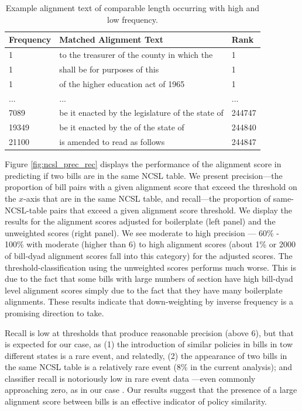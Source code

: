 \documentclass[12pt]{article} %
\begin{document}
\begin{table}[]
\centering
\caption{Example alignment text of comparable length occurring with high and low frequency.}
\label{tab:expl_align_freq}
\begin{tabular}{lll}
\hline
Frequency & Matched Alignment Text                           & Rank   \\
\hline
1         & to the treasurer of the county in which the      & 1      \\
1         & shall be for purposes of this                    & 1      \\
1         & of the higher education act of 1965              & 1      \\
...       & ...                                              & ...    \\
7089      & be it enacted by the legislature of the state of & 244747 \\
19349     & be it enacted by the of the state of             & 244840 \\
21100     & is amended to read as follows                    & 244847 \\
\hline
\end{tabular}
\end{table}


Figure \ref{fig:ncsl_prec_rec} displays the performance of the alignment score
in predicting if two bills are in the same NCSL table. We present
precision---the proportion of bill pairs with a given alignment score that
exceed the threshold on the $x$-axis that are in the same NCSL table, and
recall---the proportion of same-NCSL-table pairs that exceed a given alignment
score threshold. We display the results for the alignment scores adjusted for
boilerplate (left panel) and the unweighted scores (right panel). We see
moderate to high precision --- 60\% - 100\% with moderate
(higher than 6) to high alignment scores (about 1\% or 2000 of bill-dyad alignment
scores fall into this category) for the adjusted scores. The
threshold-classification using the unweighted scores performs much worse. This
is due to the fact that some bills with large numbers of section have high
bill-dyad level alignment scores simply due to the fact that they have many
boilerplate alignments. These results indicate that down-weighting by inverse
frequency is a promising direction to take. 

Recall is low at thresholds that produce reasonable precision (above 6), but that is expected for our case, as
(1) the introduction of similar policies in bills in tow different states is a
rare event, and relatedly, (2) the appearance of two bills in the same NCSL
table is a relatively rare event (8\% in the current analysis); and classifier recall is notoriously low in rare event data \citep{weiss2000learning}---even commonly approaching zero, as in our case \citep{weiss2004mining}. Our results suggest that the presence of a large alignment score between bills is an effective indicator of policy similarity.
\end{document}
